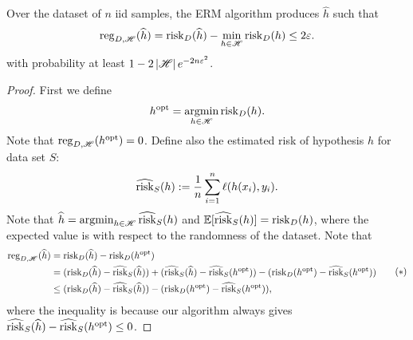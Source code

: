 \documentclass[a4paper]{article}
\begin{document}
\begin{thm}
  Over the dataset of $n$ iid samples, the ERM algorithm
  produces $\hat{h}$ such that 
  \[
  \operatorname{reg}_{D, \mathscr{H}} (\widehat{h}) 
  = \operatorname{risk}_D (\widehat{h}) - \min_{h \in \mathscr{H}} 
  \operatorname{risk}_D (h) 
  \leq 2 \varepsilon.
  \]
  with probability at least $1 - 2 \left\lvert \mathscr{H}\right\rvert e^{- 2
  n \varepsilon^2}$.
\end{thm}

\begin{proof}
{
  \newcommand{\hopt}{h^{\text{opt}}}
  First we define
  \[
    \hopt = \argmin_{h \in \scrh} \risk_D (h).
  \]
  Note that $\reg_{D, \scrh}(\hopt) = 0$. Define also the 
  estimated risk of hypothesis $h$ for data set $S$:
  \[
  \widehat{\operatorname{risk}}_S (h) := \frac{1}{n} \sum_{i=1}^n \ell(h(x_i),
  y_i).
  \]
  Note that $\widehat{h} = \operatorname*{argmin}_{h \in \mathscr{H}} 
  \widehat{\operatorname{risk}}_S (h)$ and $\mathbb{E}[\widehat{\operatorname{risk}}_S (h)] = 
  \operatorname{risk}_D(h)$, where the expected value is with respect to 
  the randomness of the dataset. Note that 
  \begin{equation*}
    \begin{aligned}
      \reg_{D, \scrh} (\hat{h}) 
      &= \risk_D (\hat{h}) - \risk_D (\hopt) \\
      &= (\risk_D (\hat{h}) - \hat{\risk}_S (\hat{h}))
      + (\hat{\risk}_S (\hat{h}) - \hat{\risk}_S (\hopt)) 
      - (\risk_D (\hopt) - \hat{\risk}_S (\hopt))  \\
      &\leq (\risk_D (\hat{h}) - \hat{\risk}_S (\hat{h}))
      - (\risk_D (\hopt) - \hat{\risk}_S (\hopt)),
    \end{aligned}
    \tag{$*$}
    \label{reg}
  \end{equation*}
  where the inequality is because our algorithm
  always gives
  $\hat{\risk}_S (\hat{h}) - \hat{\risk}_S (\hopt) \leq 0$.

}
\end{proof}
\end{document}
